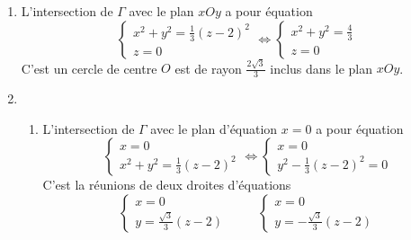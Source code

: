 \begin{enumerate}
\item L'intersection de $\Gamma$ avec le plan $xOy$ a pour équation
\begin{displaymath}
\left\{\begin{array}{l} x^2+y^2=\frac 13 (z-2)^2\\ z=0
\end{array}\right. 
\Leftrightarrow
\left\{\begin{array}{l} x^2+y^2=\frac 43\\
z=0\end{array}\right.
\end{displaymath}
C'est un cercle de centre $O$ est de rayon $\frac{2\sqrt 3}3$ inclus dans le plan $xOy$.

\item
\begin{enumerate}
\item L'intersection de $\Gamma$ avec le plan d'équation $x=0$ a pour équation 
\begin{displaymath}
\left\{\begin{array}{l} x=0\\ x^2+y^2=\frac 13 (z-2)^2
\end{array}\right. 
\Leftrightarrow
\left\{\begin{array}{l} x=0 \\ y^2-\frac 13 (z-2)^2=0\end{array}\right.
\end{displaymath}
C'est la réunions de deux droites  d'équations 
\begin{displaymath}
\left\{\begin{array}{l} x=0 \\ y=\frac {\sqrt{3}} 3 (z-2)\end{array}\right.\hspace{1cm}
\left\{\begin{array}{l} x=0 \\ y=-\frac {\sqrt3} 3 (z-2)\end{array}\right.  
\end{displaymath}


\end{enumerate}
\end{enumerate}
